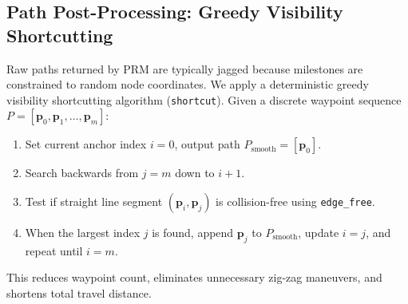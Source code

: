 \documentclass[12pt,a4paper]{article}
\begin{document}
\subsection{Path Post-Processing: Greedy Visibility Shortcutting}
Raw paths returned by PRM are typically jagged because milestones are constrained to random node coordinates. We apply a deterministic greedy visibility shortcutting algorithm (\texttt{shortcut}). Given a discrete waypoint sequence $P = [\mathbf{p}_0, \mathbf{p}_1, \dots, \mathbf{p}_m]$:
\begin{enumerate}[itemsep=1pt,topsep=1pt]
\item Set current anchor index $i = 0$, output path $P_{\text{smooth}} = [\mathbf{p}_0]$.
\item Search backwards from $j = m$ down to $i + 1$.
\item Test if straight line segment $(\mathbf{p}_i, \mathbf{p}_j)$ is collision-free using \texttt{edge\_free}.
\item When the largest index $j$ is found, append $\mathbf{p}_j$ to $P_{\text{smooth}}$, update $i = j$, and repeat until $i = m$.
\end{enumerate}
This reduces waypoint count, eliminates unnecessary zig-zag maneuvers, and shortens total travel distance.
\end{document}
